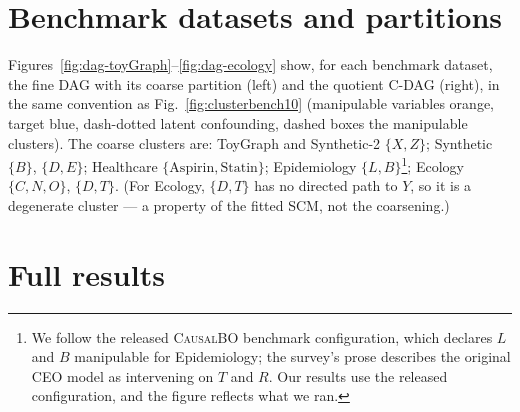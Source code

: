 \documentclass[twoside]{article}
\begin{document}
\begin{table}[t]\centering
\caption{GAP@100 on the \textsc{CausalBO} survey's benchmark datasets; best per column in bold.}
\label{tab:headtohead-gap}
\small
{}
\end{table}

\begin{table}[t]\centering
\caption{PA-GAP@100 on the \textsc{CausalBO} survey's benchmark datasets; best per column in bold.}
\label{tab:headtohead-pagap}
\small
{}
\end{table}

\section{Benchmark datasets and partitions}\label{app:datasets}
Figures~\ref{fig:dag-toyGraph}--\ref{fig:dag-ecology} show, for each benchmark dataset,
the fine DAG with its coarse partition (left) and the quotient C-DAG (right), in the same
convention as Fig.~\ref{fig:clusterbench10} (manipulable variables orange, target blue,
dash-dotted latent confounding, dashed
boxes the manipulable clusters). The coarse clusters
are: ToyGraph and Synthetic-2 $\{X,Z\}$; Synthetic $\{B\}$, $\{D,E\}$; Healthcare
$\{\text{Aspirin},\text{Statin}\}$; Epidemiology
$\{L,B\}$\footnote{We follow the released \textsc{CausalBO} benchmark configuration,
which declares $L$ and $B$ manipulable for Epidemiology; the survey's prose describes the
original CEO model as intervening on $T$ and $R$. Our results use the released
configuration, and the figure reflects what we ran.}; Ecology $\{C,N,O\}$, $\{D,T\}$.
(For Ecology, $\{D,T\}$ has no directed path to $Y$, so it is a degenerate cluster --- a
property of the fitted SCM, not the coarsening.)


\section{Full results}\label{app:fulltables}
\end{document}
